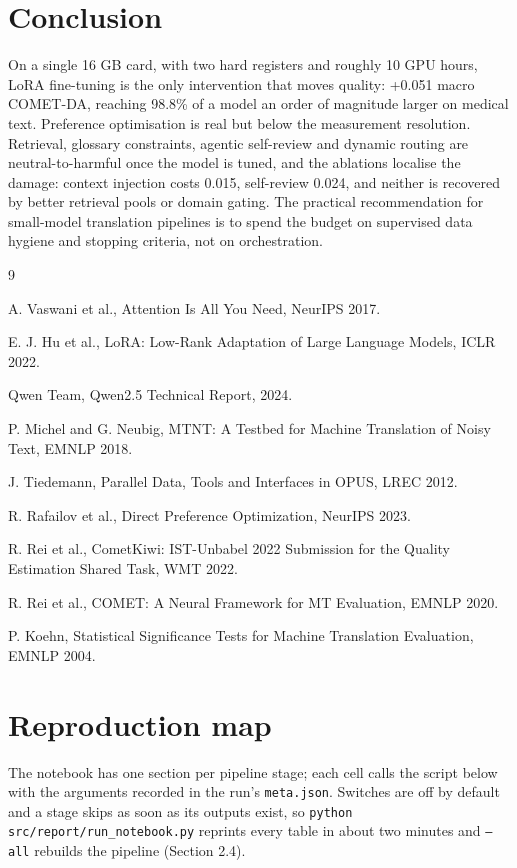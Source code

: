 \documentclass[a4paper,12pt,oneside]{article}
\begin{document}
\section{Conclusion}

On a single 16 GB card, with two hard registers and roughly 10 GPU hours, LoRA fine-tuning is
the only intervention that moves quality: +0.051 macro COMET-DA, reaching 98.8\% of a model an
order of magnitude larger on medical text. Preference optimisation is real but below the
measurement resolution. Retrieval, glossary constraints, agentic self-review and dynamic routing
are neutral-to-harmful once the model is tuned, and the ablations localise the damage: context
injection costs 0.015, self-review 0.024, and neither is recovered by better retrieval pools or
domain gating. The practical recommendation for small-model translation pipelines is to spend
the budget on supervised data hygiene and stopping criteria, not on orchestration.

\begin{thebibliography}{9}\small

 A. Vaswani et al., Attention Is All You Need, NeurIPS 2017.

 E. J. Hu et al., LoRA: Low-Rank Adaptation of Large Language Models, ICLR 2022.

 Qwen Team, Qwen2.5 Technical Report, 2024.

 P. Michel and G. Neubig, MTNT: A Testbed for Machine Translation of Noisy Text, EMNLP 2018.

 J. Tiedemann, Parallel Data, Tools and Interfaces in OPUS, LREC 2012.

 R. Rafailov et al., Direct Preference Optimization, NeurIPS 2023.

 R. Rei et al., CometKiwi: IST-Unbabel 2022 Submission for the Quality Estimation Shared Task, WMT 2022.

 R. Rei et al., COMET: A Neural Framework for MT Evaluation, EMNLP 2020.

 P. Koehn, Statistical Significance Tests for Machine Translation Evaluation, EMNLP 2004.

\end{thebibliography}

\appendix
\section{Reproduction map}
The notebook has one section per pipeline stage; each cell calls the script below with the
arguments recorded in the run's \texttt{meta.json}. Switches are off by default and a stage skips
as soon as its outputs exist, so \texttt{python src/report/run\_notebook.py} reprints every table
in about two minutes and \texttt{--all} rebuilds the pipeline (Section 2.4).
\end{document}
